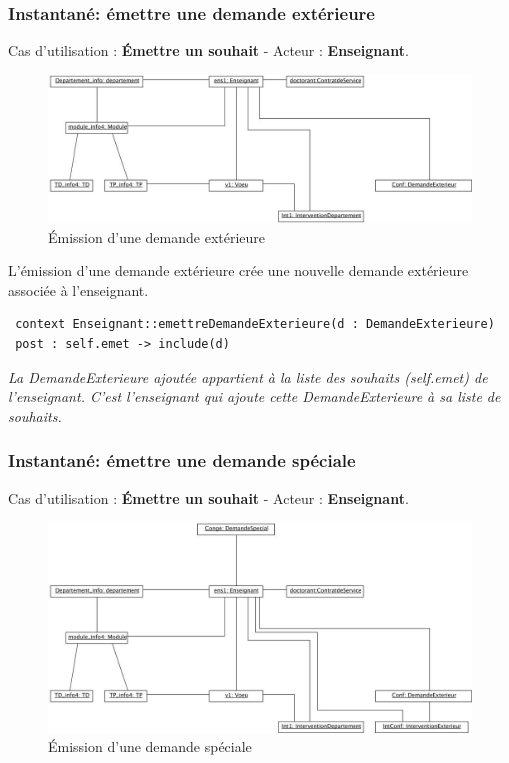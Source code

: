  \subsubsection{Instantané: émettre une demande extérieure}
 \indent Cas d'utilisation : \textbf{\'Emettre un souhait} - Acteur : \textbf{Enseignant}.

 \begin{figure}[!htbp]
 \begin{center}
 \includegraphics[width=14cm]{fig/5-EmissionDemandeExterieur.jpg}
 \caption{\'Emission d'une demande extérieure}
 \end{center}
 \end{figure}

 \indent L'émission d'une demande extérieure crée une nouvelle demande extérieure associée à l'enseignant.
 \begin{verbatim}
 context Enseignant::emettreDemandeExterieure(d : DemandeExterieure)
 post : self.emet -> include(d)
 \end{verbatim}
 \emph{La DemandeExterieure ajoutée appartient à la liste des souhaits (self.emet) de l'enseignant. C'est l'enseignant qui ajoute cette DemandeExterieure à sa liste de souhaits.}

 \subsubsection{Instantané: émettre une demande spéciale}
 \indent Cas d'utilisation : \textbf{\'Emettre un souhait} - Acteur : \textbf{Enseignant}.

 \begin{figure}[!htbp]
 \begin{center}
 \includegraphics[width=14cm]{fig/7-EmissionSpecial.jpg}
 \caption{\'Emission d'une demande spéciale}
 \end{center}
 \end{figure}

